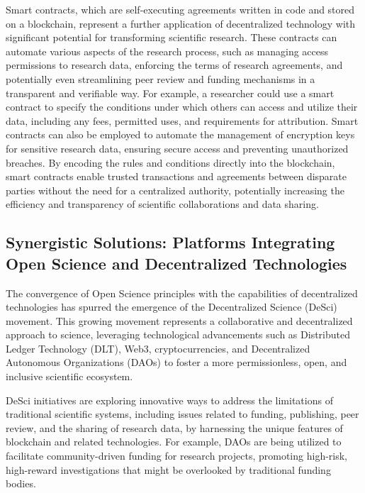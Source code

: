 Smart contracts, which are self-executing agreements written in code and stored on a blockchain, represent a further application of decentralized technology with significant potential for transforming scientific research. These contracts can automate various aspects of the research process, such as managing access permissions to research data, enforcing the terms of research agreements, and potentially even streamlining peer review and funding mechanisms in a transparent and verifiable way. For example, a researcher could use a smart contract to specify the conditions under which others can access and utilize their data, including any fees, permitted uses, and requirements for attribution. Smart contracts can also be employed to automate the management of encryption keys for sensitive research data, ensuring secure access and preventing unauthorized breaches. By encoding the rules and conditions directly into the blockchain, smart contracts enable trusted transactions and agreements between disparate parties without the need for a centralized authority, potentially increasing the efficiency and transparency of scientific collaborations and data sharing.



\subsection{Synergistic Solutions: Platforms Integrating Open Science and Decentralized Technologies}

The convergence of Open Science principles with the capabilities of decentralized technologies has spurred the emergence of the Decentralized Science (DeSci) movement. This growing movement represents a collaborative and decentralized approach to science, leveraging technological advancements such as Distributed Ledger Technology (DLT), Web3, cryptocurrencies, and Decentralized Autonomous Organizations (DAOs) to foster a more permissionless, open, and inclusive scientific ecosystem.

DeSci initiatives are exploring innovative ways to address the limitations of traditional scientific systems, including issues related to funding, publishing, peer review, and the sharing of research data, by harnessing the unique features of blockchain and related technologies. For example, DAOs are being utilized to facilitate community-driven funding for research projects, promoting high-risk, high-reward investigations that might be overlooked by traditional funding bodies.

